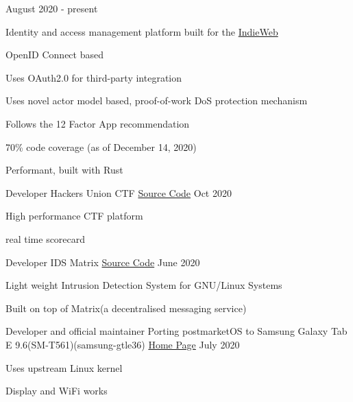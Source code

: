 \begin{cventries}
    {August 2020 - present} %
    {
      \begin{cvitems} %
      	\item {Identity and access management platform built for the \href{https://github.com/shuttlecraft/identity/blob/master/indieweb.org}{IndieWeb}}
		\item {OpenID Connect based}
		\item {Uses OAuth2.0 for third-party integration}
		\item {Uses novel actor model based, proof-of-work DoS protection mechanism}
		\item {Follows the 12 Factor App recommendation}
		\item {70\% code coverage  (as of December 14, 2020)}
		\item {Performant, built with Rust}
	  \end{cvitems}
    }
    
  \cventry
    {Developer}
    {Hackers Union CTF}
    {\href{https://github.com/realaravinth/hunion-backend}{Source Code}}
    {Oct 2020}
    {
        \begin{cvitems} %
        \item {High performance CTF platform}
        \item {real time scorecard}
        \end{cvitems}
    }
    
  \cventry
    {Developer}
    {IDS Matrix}
    {\href{https://github.com/realaravinth/ids-matrix}{Source Code}}
    {June 2020}
    {
        \begin{cvitems} %
        \item {Light weight Intrusion Detection System for GNU/Linux Systems}
        \item {Built on top of Matrix(a decentralised messaging service)}
      \end{cvitems}
    }
    
    \cventry
    {Developer and official maintainer}
    {Porting postmarketOS to Samsung Galaxy Tab E 9.6(SM-T561)(samsung-gtle36)}
    {\href{https://wiki.postmarketos.org/wiki/Samsung_Galaxy_Tab_E_9.6_(SM-T561)_(samsung-gtel3g)}{Home Page}}
    {July 2020}
    {
        \begin{cvitems} %
            \item {Uses upstream Linux kernel}
            \item {Display and WiFi works}
        \end{cvitems}
    }
    

\end{cventries}
